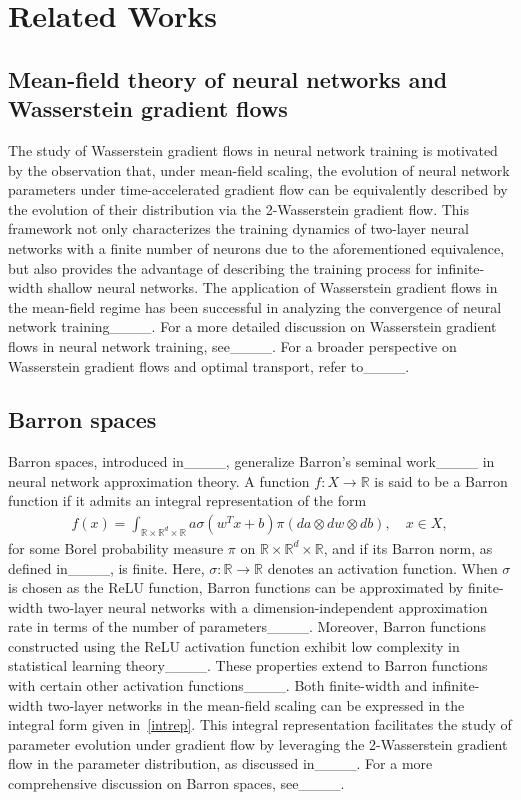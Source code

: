 \section{Related Works}
\subsection{Mean-field theory of neural networks and Wasserstein gradient flows}

The study of Wasserstein gradient flows in neural network training is motivated by the observation that, under mean-field scaling, the evolution of neural network parameters under time-accelerated gradient flow can be equivalently described by the evolution of their distribution via the 2-Wasserstein gradient flow. This framework not only characterizes the training dynamics of two-layer neural networks with a finite number of neurons due to the aforementioned equivalence, but also provides the advantage of describing the training process for infinite-width shallow neural networks. The application of Wasserstein gradient flows in the mean-field regime has been successful in analyzing the convergence of neural network training____. For a more detailed discussion on Wasserstein gradient flows in neural network training, see____. For a broader perspective on Wasserstein gradient flows and optimal transport, refer to____.

\subsection{Barron spaces}

Barron spaces, introduced in____, generalize Barron's seminal work____ in neural network approximation theory. A function $f: X \to \mathbb{R}$ is said to be a Barron function if it admits an integral representation of the form  
\begin{align}\label{intrep}
    f(x) = \int_{\mathbb{R} \times \mathbb{R}^{d} \times \mathbb{R}} a \sigma(w^T x + b) \pi(da \otimes dw \otimes db), \quad x \in X,
\end{align}  
for some Borel probability measure $\pi$ on $\mathbb{R} \times \mathbb{R}^{d} \times \mathbb{R}$, and if its Barron norm, as defined in____, is finite. Here, $\sigma: \mathbb{R} \to \mathbb{R}$ denotes an activation function. When $\sigma$ is chosen as the ReLU function, Barron functions can be approximated by finite-width two-layer neural networks with a dimension-independent approximation rate in terms of the number of parameters____. Moreover, Barron functions constructed using the ReLU activation function exhibit low complexity in statistical learning theory____. These properties extend to Barron functions with certain other activation functions____. Both finite-width and infinite-width two-layer networks in the mean-field scaling can be expressed in the integral form given in~\eqref{intrep}. This integral representation facilitates the study of parameter evolution under gradient flow by leveraging the 2-Wasserstein gradient flow in the parameter distribution, as discussed in____. For a more comprehensive discussion on Barron spaces, see____.